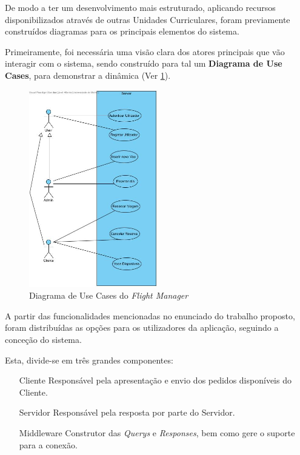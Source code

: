 \documentclass[a4paper,11pt]{scrreprt}
\begin{document}
De modo a ter um desenvolvimento mais estruturado, aplicando recursos disponibilizados através de outras 
Unidades Curriculares, foram previamente construídos diagramas para os principais elementos do sistema.

Primeiramente, foi necessária uma visão clara dos atores principais que vão interagir com o sistema, sendo construído
para tal um \textbf{Diagrama de Use Cases}, para demonstrar a dinâmica (Ver \ref{dig:use_cases}).

\begin{figure}[H] \label{dig:use_cases}
    \centering
    \includegraphics[width=0.5\textwidth]{diagrams/Server Use Case Diagram.jpg}
    \caption{Diagrama de Use Cases do \textit{Flight Manager}}
\end{figure}

A partir das funcionalidades mencionadas no enunciado do trabalho proposto, foram distribuídas as opções para os
utilizadores da aplicação, seguindo a conceção do sistema.

Esta, divide-se em três grandes componentes:
\begin{itemize}
    \item[Cliente]{Responsável pela apresentação e envio dos pedidos disponíveis do Cliente.}
    \item[Servidor]{Responsável pela resposta por parte do Servidor.} 
    \item[Middleware]{Construtor das \textit{Querys} e \textit{Responses}, bem como gere o suporte para a conexão.} 
\end{itemize}
\end{document}
